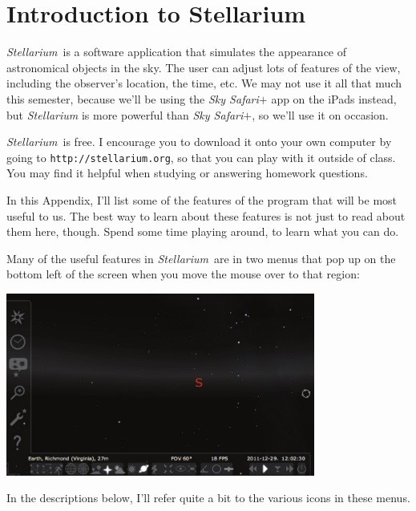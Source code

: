 \section{Introduction to Stellarium}
\label{app:stell}
\newcommand{\stellarium}{\textit{Stellarium}}
\newcommand{\icon}[1]{\texttt{[image: appendices/stellarium/stell-\#1.pdf]}}

\bigskip\bigskip

\stellarium\ is a software application that simulates the appearance
of astronomical objects in the sky. The user can adjust lots of
features of the view, including the observer's location,
the time, etc. We may not use it all that much this semester,
because we'll be using the \textit{Sky Safari$+$} app on the iPads
instead, but \textit{Stellarium} is more powerful than
\textit{Sky Safari$+$}, so we'll use it on occasion.

\stellarium\ is free. I encourage you to download it onto your own computer
by going to {\tt http://stellarium.org},
so that you can play with it outside of class. You may find it helpful when 
studying or answering homework questions.

In this Appendix, I'll list some of the features of the program that will
be most useful to us. The best way to learn about these features is not
just to read about them here, though. Spend some time playing around, to learn
what you can do.

Many of the useful features in \stellarium\ are in two menus that pop up
on the bottom left of the screen when you move the mouse over to
that region:

\begin{center}
\vspace{0.1in}
\includegraphics[width=4in]{appendices/stellarium/stellarium-icons.pdf}
\vspace{0.1in}
\end{center}

In the descriptions below, I'll refer quite a bit to
the various icons in these menus. 

